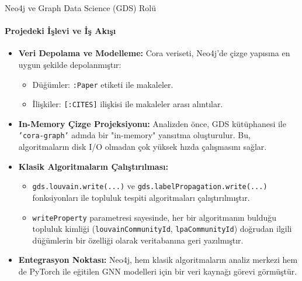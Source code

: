 \documentclass{beamer}
\begin{document}
\begin{frame}{Neo4j ve Graph Data Science (GDS) Rolü}
    \framesubtitle{Projedeki İşlevi ve İş Akışı}
    \begin{itemize}
        \item \textbf{Veri Depolama ve Modelleme:} Cora veriseti, Neo4j'de çizge yapısına en uygun şekilde depolanmıştır:
        \begin{itemize}
            \item Düğümler: \texttt{:Paper} etiketi ile makaleler.
            \item İlişkiler: \texttt{[:CITES]} ilişkisi ile makaleler arası alıntılar.
        \end{itemize}
        \item \textbf{In-Memory Çizge Projeksiyonu:} Analizden önce, GDS kütüphanesi ile \texttt{'cora-graph'} adında bir "in-memory" yansıtma oluşturulur. Bu, algoritmaların disk I/O olmadan çok yüksek hızda çalışmasını sağlar.
        \item \textbf{Klasik Algoritmaların Çalıştırılması:}
        \begin{itemize}
            \item \texttt{gds.louvain.write(...)} ve \texttt{gds.labelPropagation.write(...)} fonksiyonları ile topluluk tespiti algoritmaları çalıştırılmıştır.
            \item \texttt{writeProperty} parametresi sayesinde, her bir algoritmanın bulduğu topluluk kimliği (\texttt{louvainCommunityId}, \texttt{lpaCommunityId}) doğrudan ilgili düğümlerin bir özelliği olarak veritabanına geri yazılmıştır.
        \end{itemize}
        \item \textbf{Entegrasyon Noktası:} Neo4j, hem klasik algoritmaların analiz merkezi hem de PyTorch ile eğitilen GNN modelleri için bir veri kaynağı görevi görmüştür.
    \end{itemize}
\end{frame}
\end{document}
